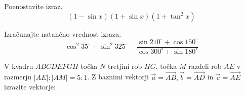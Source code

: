 \documentclass[addpoints]{exam}
\begin{document}
\begin{questions}


    \question[4]
    Poenostavite izraz. 
    $$ \left(1-\sin{x}\right)\left(1+\sin{x}\right)\left(1+\tan^2{x}\right) $$

    \begin{solution}[6.5cm]
       
    \end{solution}



    \question[4]
    Izračunajte natančno vrednost izraza. 
    $$ \cos^2 35^\circ + \sin^2 325^\circ - \dfrac{\sin{210^\circ+\cos{150^\circ}}}{\cos{300^\circ+\sin{180^\circ}}} $$

    \begin{solution}[6cm]
       
    \end{solution}


\newpage

    \question
    V kvadru $ABCDEFGH$ točka $N$ tretjini rob $HG$, točka $M$ razdeli rob $AE$ v razmerju $|AE|:|AM|=5:1$.
    Z baznimi vektorji $\overrightarrow{a}=\overrightarrow{AB}, \overrightarrow{b}=\overrightarrow{AD}$ in $\overrightarrow{c}=\overrightarrow{AE}$ izrazite vektorje: 

    \begin{solution}[5cm]

    \end{solution}

    

    


\end{questions}
\end{document}
